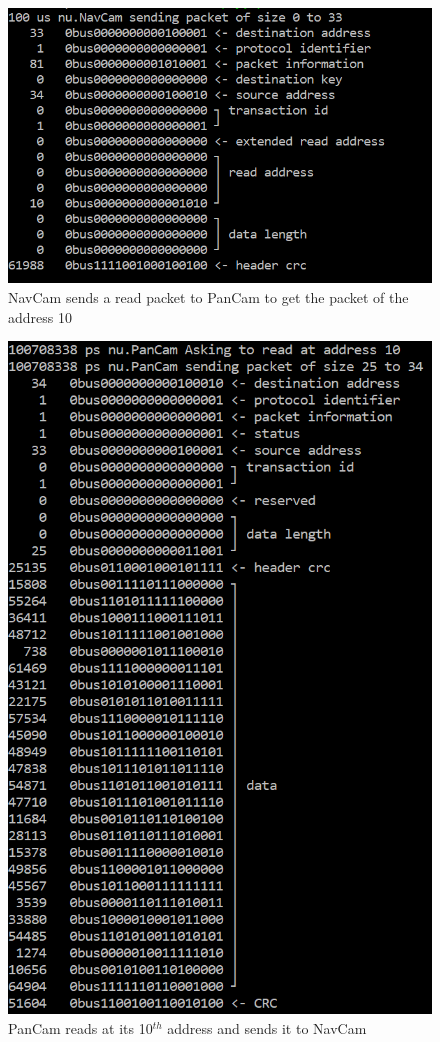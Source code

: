 \documentclass[12pt,a4paper]{article}
\begin{document}
\begin{figure}[h]
	\centering
    \includegraphics[scale = 0.5]{results/NavCam_send_read_packet.png}
    \caption{NavCam sends a read packet to PanCam to get the packet of the address 10}
\end{figure}
\smallbreak

\begin{figure}[h]
	\centering
    \includegraphics[scale = 0.5]{results/PanCam_reads_at_his_address.png}
    \caption{PanCam reads at its 10$^{th}$ address and sends it to NavCam}
\end{figure}
\end{document}
